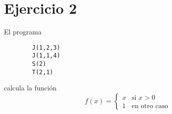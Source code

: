\section{Ejercicio 2}
		El programa
		\begin{verbatim}
		J(1,2,3)
		J(1,1,4)
		S(2)
		T(2,1)
		\end{verbatim}
		calcula la función
		\begin{equation*}
  			f(x) = \left\{ 
  			\begin{array}{rl}
  				x & \text{si } x>0 \\
  				1 & \text{en otro caso} 
  			\end{array} \right.
  		\end{equation*}
